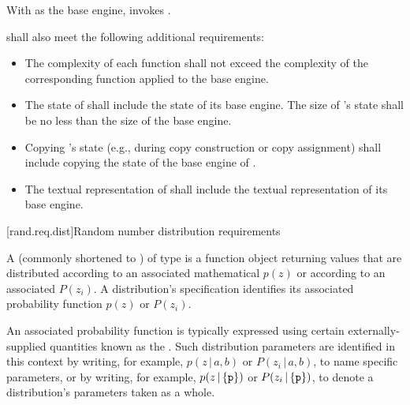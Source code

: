 \begin{itemdescr}
\pnum
\effects
 With  as the base engine, invokes .
\end{itemdescr}

\pnum
{} shall also meet
the following additional requirements:
\begin{itemize}
 \item
   The complexity
   of each function
   shall not exceed the complexity
   of the corresponding function
   applied to the base engine.
 \item
   The state
   of 
   shall include the state
   of its base engine.
   The size of 's state
   shall be no less than the size of the base engine.
 \item
   Copying 's state
   (e.g., during copy construction or copy assignment)
   shall include copying
   the state of the base engine of .
 \item
   The textual representation
   of 
   shall include
   the textual representation of its base engine.
\end{itemize}


[rand.req.dist]{Random number distribution requirements}%
%

\pnum
A 
(commonly shortened to )
 of type 
is a function object
returning values
that are distributed according to
an associated mathematical 
$p(z)$
or according to
an associated 
$P(z_i)$.
A distribution's specification
identifies its associated probability function
$p(z)$ or $P(z_i)$.

\pnum
An associated probability function is typically expressed
using certain externally-supplied quantities
known as the .
Such distribution parameters are identified
in this context by writing, for example,
  $p(z\,|\,a,b)$ or $P(z_i\,|\,a,b)$,
  to name specific parameters,
or by writing, for example,
  $p(z\,|\left\{\tcode{p}\right\})$
  or $P(z_i\,|\left\{\tcode{p}\right\})$,
  to denote a distribution's parameters  taken as a whole.

